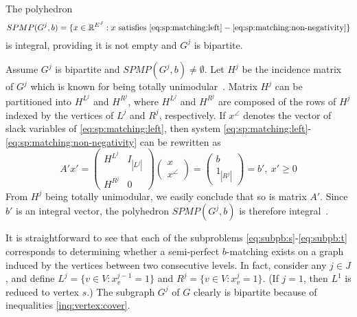 \begin{lemma} \label{lemma:semi-perfect:matching polytope}
The polyhedron
\begin{equation*}
SPMP(G^j,b) = \{x \in \mathbb{R}^{E^J} : x \textrm{ satisfies } \eqref{eq:sp:matching:left}-\eqref{eq:sp:matching:non-negativity}\}
\end{equation*}
is integral, providing it is not empty and $G^j$ is bipartite.
\end{lemma}
\bopr Assume $G^j$ is bipartite and $SPMP(G^j,b) \not= \emptyset$.
Let $H^j$ be the incidence matrix of $G^j$ which is known for being
totally unimodular~\cite{motzkin}. Matrix $H^j$ can be partitioned
into $H^{L^j}$ and $H^{R^j}$, where $H^{L^j}$ and $H^{R^j}$ are
composed of the rows of $H^j$ indexed by the vertices of $L^j$ and
$R^j$, respectively.  If $x^\angle$ denotes the vector of slack variables of
\eqref{eq:sp:matching:left}, then system
\eqref{eq:sp:matching:left}-\eqref{eq:sp:matching:non-negativity} can
be rewritten as
\begin{equation*}
A'x' = \begin{pmatrix} H^{L^j} & I_{|L^j|}\\ H^{R^j} & 0 \end{pmatrix} \begin{pmatrix} x\\ x^\angle \end{pmatrix} = \begin{pmatrix} b\\ 1_{|R^j|}\end{pmatrix} = b',~ x'\geq 0
\end{equation*}
From $H^j$ being totally unimodular, we easily conclude that so is
matrix $A'$.  Since $b'$ is an integral vector, the polyhedron
$SPMP(G^j,b)$ is therefore integral~\cite{hoffmankruskal}.  \epr




It is straightforward to see that each of the subproblems
\eqref{eq:subpb:s}-\eqref{eq:subpb:t} corresponds to determining
whether a semi-perfect $b$-matching exists on a graph induced by the
vertices between two consecutive levels. In fact, consider any $j \in
J$, and define $L^j = \{v \in V : x_v^{j-1} = 1\}$ and $R^j = \{v \in
V : x_v^j = 1\}$. (If $j=1$, then $L^1$ is reduced to vertex $s$.)
The subgraph $G^j$ of $G$ clearly is bipartite because of inequalities
\eqref{inq:vertex:cover}.

